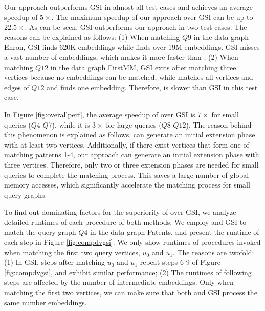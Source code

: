 Our approach outperforms GSI in almost all test cases and achieves an average speedup of $5\times$. The maximum speedup of our approach over GSI can be up to $22.5\times$. As can be seen, GSI outperforms our approach in two test cases. The reasons can be explained as follows: (1) When matching $Q9$ in the data graph Enron, GSI finds 620K embeddings while \SystemName finds over 19M embeddings. GSI misses a vast number of embeddings, which makes it more faster than \SystemName; (2) When matching $Q12$ in the data graph FirstMM, GSI exits after matching three vertices because no embeddings can be matched, while \SystemName matches all vertices and edges of $Q12$ and finds one embedding. Therefore, \SystemName is slower than GSI in this test case.

In Figure \ref{fig:overallperf}, the average speedup of \SystemName over GSI is $7\times$ for small queries ($Q4$-$Q7$), while it is $3\times$ for large queries ($Q8$-$Q12$). The reason behind this phenomenon is explained as follows. \SystemName can generate an initial extension phase with at least two vertices. Additionally, if there exist vertices that form one of matching patterns 1-4, our approach can generate an initial extension phase with three vertices. Therefore, only two or three extension phases are needed for small queries to complete the matching process. This saves a large number of global memory accesses, which significantly accelerate the matching process for small query graphs.

To find out dominating factors for the superiority of \SystemName over GSI, we analyze detailed runtimes of each procedure of both methods. We employ \SystemName and GSI to match the query graph $Q4$ in the data graph Patents, and present the runtime of each step in Figure \ref{fig:compdvgsi}. We only show runtimes of procedures invoked when matching the first two query vertices, $u_0$ and $u_1$. The reasons are twofold: (1) In GSI, steps after matching $u_0$ and $u_1$ repeat steps 6-9 of Figure \ref{fig:compdvgsi}, and exhibit similar performance; (2) The runtimes of following steps are affected by the number of intermediate embeddings. Only when matching the first two vertices, we can make sure that both \SystemName and GSI process the same number embeddings.


